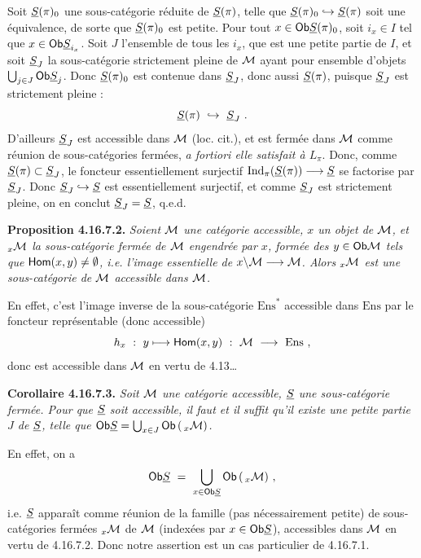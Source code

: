 Soit $\underline{S}(\pi)_0$ une sous-catégorie réduite de $\underline{S}(\pi)$, telle que $\underline{S}(\pi)_0 \hookrightarrow \underline{S}(\pi)$ soit une équivalence, de sorte que $\underline{S}(\pi)_0$ est petite. Pour tout $x \in \mathsf{Ob} \underline{S}(\pi)_0$, soit $i_x \in I$ tel que $x \in \mathsf{Ob} \underline{S}_{i_x}$. Soit $J$ l'ensemble de tous les $i_x$, que est une petite partie de $I$, et soit $\underline{S}_J$ la sous-catégorie strictement pleine de $\mathcal{M}$ ayant pour ensemble d'objets $\bigcup_{j\in J} \mathsf{Ob} \underline{S}_j$. Donc $\underline{S}(\pi)_0$ est contenue dans $\underline{S}_J$, donc aussi $\underline{S}(\pi)$, puisque $\underline{S}_J$ est strictement pleine : %
\[
\underline{S}(\pi) \ \hookrightarrow\ \underline{S}_J \ .
\]
D'ailleurs $\underline{S}_J$ est accessible dans $\mathcal{M}$ (loc. cit.), et est fermée dans $\mathcal{M}$ comme réunion de sous-catégories fermées, \textit{a fortiori elle satisfait à $L_\pi$}. Donc, comme $\underline{S}(\pi) \subset \underline{S}_J$, le foncteur essentiellement surjectif $\operatorname{Ind}_\pi(\underline{S}(\pi)) \longrightarrow \underline{S}$ se factorise par $\underline{S}_J$. Donc $\underline{S}_J \hookrightarrow \underline{S}$ est essentiellement surjectif, et comme $\underline{S}_J$ est strictement pleine, on en conclut $\underline{S}_J = \underline{S}$, q.e.d.

\textbf{Proposition 4.16.7.2.} \textit{Soient $\mathcal{M}$ une catégorie accessible, $x$ un objet de $\mathcal{M}$, et ${}_x\mathcal{M}$ la sous-catégorie fermée de $\mathcal{M}$ engendrée par $x$, formée des $y \in \mathsf{Ob} \mathcal{M}$ tels que $\mathsf{Hom}(x,y) \neq \emptyset$, i.e. l'image essentielle de $x\backslash\mathcal{M} \longrightarrow \mathcal{M}$. Alors ${}_x\mathcal{M}$ est une sous-catégorie de $\mathcal{M}$ accessible dans $\mathcal{M}$.}

En effet, c'est l'image inverse de la sous-catégorie $\mathrm{Ens}^*$ accessible dans $\mathrm{Ens}$ par le foncteur représentable (donc accessible)
\[
h_x \ :\ y \longmapsto \Hom(x,y) \ :\ \cM \ \longrightarrow\ \mathrm{Ens} \ ,
\]
donc est accessible dans $\mathcal{M}$ en vertu de 4.13\dots

\textbf{Corollaire 4.16.7.3.} \textit{Soit $\mathcal{M}$ une catégorie accessible, $\underline{S}$ une sous-catégorie fermée. Pour que $\underline{S}$ soit accessible, il faut et il suffit qu'il existe une \textup{petite} partie $J$ de $\underline{S}$, telle que $\mathsf{Ob} \underline{S} = \bigcup_{x\in J} \mathsf{Ob}\,(\,{}_x\mathcal{M})$.}

En effet, on a
\[
\Ob \uS \ =\ \bigcup_{x\in\Ob\uS} \Ob\,(\,{}_x\cM) \ ,
\]
i.e. $\underline{S}$ apparaît comme réunion de
la famille (pas nécessairement petite) de sous-catégories fermées ${}_x\mathcal{M}$ de $\mathcal{M}$ (indexées par $x \in \mathsf{Ob} \underline{S}$), accessibles dans $\mathcal{M}$ en vertu de 4.16.7.2. Donc notre assertion est un cas particulier de 4.16.7.1.

